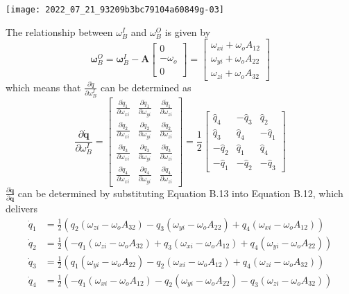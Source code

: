 \texttt{[image: 2022\_07\_21\_93209b3bc79104a60849g-03]}

The relationship between $\omega_{B}^{I}$ and $\omega_{B}^{O}$ is given by
$$
\boldsymbol{\omega}_{B}^{O}=\boldsymbol{\omega}_{B}^{I}-\mathbf{A}\left[\begin{array}{c}
0 \\
-\omega_{o} \\
0
\end{array}\right]=\left[\begin{array}{c}
\omega_{x i}+\omega_{o} A_{12} \\
\omega_{y i}+\omega_{o} A_{22} \\
\omega_{z i}+\omega_{o} A_{32}
\end{array}\right]
$$
which means that $\frac{\partial \dot{q}}{\partial \omega_{B}^{I}}$ can be determined as
$$
\frac{\partial \dot{\mathbf{q}}}{\partial \omega_{B}^{I}}=\left[\begin{array}{ccc}
\frac{\partial \dot{q}_{1}}{\partial \omega_{x i}} & \frac{\partial \dot{q}_{1}}{\partial \omega_{y i}} & \frac{\partial \dot{q}_{1}}{\partial \omega_{z i}} \\
\frac{\partial \dot{q}_{2}}{\partial \omega_{x i}} & \frac{\partial \dot{q}_{2}}{\partial \omega_{y i}} & \frac{\partial \dot{q}_{2}}{\partial \omega_{z i}} \\
\frac{\partial \dot{q}_{3}}{\partial \omega_{x i}} & \frac{\partial \dot{q}_{3}}{\partial \omega_{y i}} & \frac{\partial \dot{q}_{3}}{\partial \omega_{z i}} \\
\frac{\partial \dot{q}_{4}}{\partial \omega_{x i}} & \frac{\partial \dot{q}_{4}}{\partial \omega_{y i}} & \frac{\partial \dot{q}_{4}}{\partial \omega_{z i}}
\end{array}\right]=\frac{1}{2}\left[\begin{array}{ccc}
\hat{q}_{4} & -\hat{q}_{3} & \hat{q}_{2} \\
\hat{q}_{3} & \hat{q}_{4} & -\hat{q}_{1} \\
-\hat{q}_{2} & \hat{q}_{1} & \hat{q}_{4} \\
-\hat{q}_{1} & -\hat{q}_{2} & -\hat{q}_{3}
\end{array}\right]
$$
$\frac{\partial \dot{\mathbf{q}}}{\partial \mathbf{q}}$ can be determined by substituting Equation B.13 into Equation B.12, which delivers
$$
\begin{aligned}
\dot{q}_{1} &=\frac{1}{2}\left(q_{2}\left(\omega_{z i}-\omega_{o} A_{32}\right)-q_{3}\left(\omega_{y i}-\omega_{o} A_{22}\right)+q_{4}\left(\omega_{x i}-\omega_{o} A_{12}\right)\right) \\
\dot{q}_{2} &=\frac{1}{2}\left(-q_{1}\left(\omega_{z i}-\omega_{o} A_{32}\right)+q_{3}\left(\omega_{x i}-\omega_{o} A_{12}\right)+q_{4}\left(\omega_{y i}-\omega_{o} A_{22}\right)\right) \\
\dot{q}_{3} &=\frac{1}{2}\left(q_{1}\left(\omega_{y i}-\omega_{o} A_{22}\right)-q_{2}\left(\omega_{x i}-\omega_{o} A_{12}\right)+q_{4}\left(\omega_{z i}-\omega_{o} A_{32}\right)\right) \\
\dot{q}_{4} &=\frac{1}{2}\left(-q_{1}\left(\omega_{x i}-\omega_{o} A_{12}\right)-q_{2}\left(\omega_{y i}-\omega_{o} A_{22}\right)-q_{3}\left(\omega_{z i}-\omega_{o} A_{32}\right)\right)
\end{aligned}
$$
